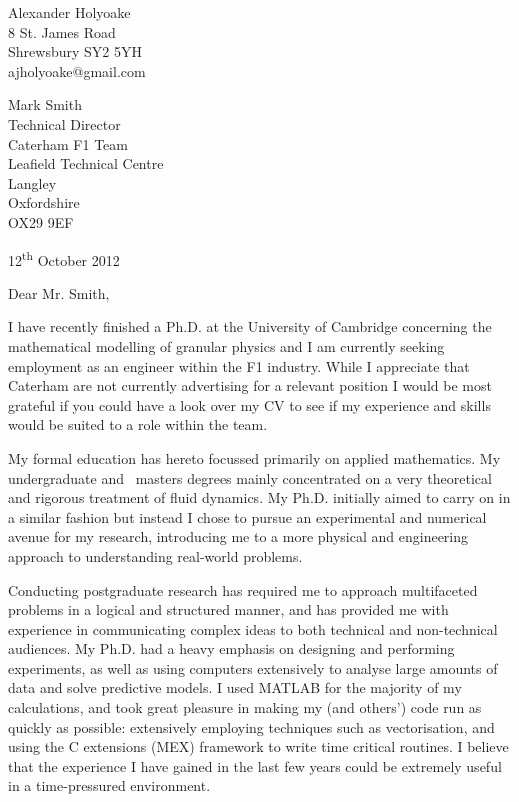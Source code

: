 \documentclass[a4paper,10pt]{article}
\begin{document}
\begin{flushright}
Alexander Holyoake \\ 8 St. James Road \\ Shrewsbury SY2 5YH \\ ajholyoake@gmail.com
\end{flushright}

\begin{flushleft} 
Mark Smith \\ Technical Director \\ Caterham F1 Team \\ Leafield Technical Centre \\ Langley \\ Oxfordshire \\ OX29 9EF
\end{flushleft}

\begin{flushright}
12\textsuperscript{th} October 2012
\end{flushright}
\noindent Dear Mr. Smith, 

I have recently finished a Ph.D. at the University of Cambridge concerning the mathematical modelling of granular physics and I am currently seeking employment as an engineer within the F1 industry. While I appreciate that Caterham are not currently advertising for a relevant position I would be most grateful if you could have a look over my CV to see if my experience and skills would be suited to a role within the team. 

My formal education has hereto focussed primarily on applied mathematics. My undergraduate and  masters degrees mainly concentrated on a very theoretical and rigorous treatment of fluid dynamics. My Ph.D. initially aimed to carry on in a similar fashion but instead I chose to pursue an experimental and numerical avenue for my research, introducing me to a more physical and engineering approach to understanding real-world problems.

Conducting postgraduate research has required me to approach multifaceted problems in a logical and structured manner, and has provided me with experience in communicating complex ideas to both technical and non-technical audiences. My Ph.D. had a heavy emphasis on designing and performing experiments, as well as using computers extensively to analyse large amounts of data and solve predictive models. I used MATLAB for the majority of my calculations, and took great pleasure in making my (and others') code run as quickly as possible: extensively employing techniques such as vectorisation, and using the C extensions (MEX) framework to write time critical routines. I believe that the experience I have gained in the last few years could be extremely useful in a time-pressured environment. 
\end{document}
